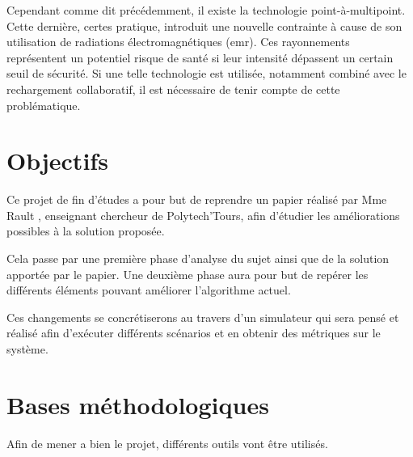\documentclass[noposter]{polytech}
\begin{document}
		Cependant comme dit précédemment, il existe la technologie point-à-multipoint.
		Cette dernière, certes pratique, introduit une nouvelle contrainte à cause de son utilisation de radiations électromagnétiques (\gls{emr}).
		Ces rayonnements représentent un potentiel risque de santé si leur intensité dépassent un certain seuil de sécurité.
		Si une telle technologie est utilisée, notamment combiné avec le rechargement collaboratif, il est nécessaire de tenir compte de cette problématique.
		
	\section{Objectifs}%
		Ce projet de fin d'études a pour but de reprendre un papier réalisé par Mme Rault \cite{Rault:chargers}, enseignant chercheur de Polytech'Tours, afin d'étudier les améliorations possibles à la solution proposée.
		
		Cela passe par une première phase d'analyse du sujet ainsi que de la solution apportée par le papier.
		Une deuxième phase aura pour but de repérer les différents éléments pouvant améliorer l'algorithme actuel.
		
		Ces changements se concrétiserons au travers d'un simulateur qui sera pensé et réalisé afin d'exécuter différents scénarios et en obtenir des métriques sur le système.
	
	
	\section{Bases méthodologiques}%
		Afin de mener a bien le projet, différents outils vont être utilisés.
		
\end{document}

